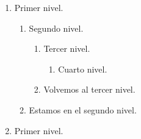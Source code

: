 \documentclass[a4paper,12pt]{article}
\begin{document}
   \begin{enumerate}
    \item Primer nivel.
        \begin{enumerate}
            \item Segundo nivel.
                \begin{enumerate}
                    \item Tercer nivel.
                        \begin{enumerate}
                            \item Cuarto nivel.
                        \end{enumerate}
                    \item Volvemos al tercer nivel.
                \end{enumerate}
            \item Estamos en el segundo nivel.
        \end{enumerate}
    \item Primer nivel.
 \end{enumerate}

 
\end{document}
